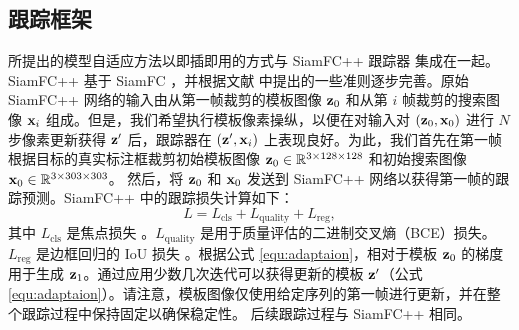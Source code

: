 \subsection{跟踪框架}
所提出的模型自适应方法以即插即用的方式与 SiamFC++ 跟踪器 \cite{SiamFC++} 集成在一起。 SiamFC++ 基于 SiamFC \cite{SiamFC}，并根据文献 \cite{SiamFC++} 中提出的一些准则逐步完善。原始 SiamFC++ 网络的输入由从第一帧裁剪的模板图像 $\textbf z_0$ 和从第 $i$ 帧裁剪的搜索图像 $\textbf x_i$ 组成。但是，我们希望执行模板像素操纵，以便在对输入对 $(\textbf z_0, \textbf x_0)$ 进行 $N$ 步像素更新获得 $\textbf z'$ 后，跟踪器在 $(\textbf z', \textbf x_i)$ 上表现良好。为此，我们首先在第一帧根据目标的真实标注框裁剪初始模板图像 $\textbf z_0\in\mathbb R^{3\times128\times 128}$ 和初始搜索图像 $\textbf x_0\in\mathbb R^{3\times303\times 303}$。
然后，将 $\textbf z_0$ 和 $\textbf x_0$ 发送到 SiamFC++ 网络以获得第一帧的跟踪预测。SiamFC++ \cite{SiamFC++} 中的跟踪损失计算如下：
\begin{equation}
    L = L_{\text{cls}} + L_{\text{quality}} + L_{\text{reg}},
\end{equation}
其中 $L_{\text{cls}}$ 是焦点损失 \cite{focal}。$L_{\text{quality}}$ 是用于质量评估的二进制交叉熵（BCE）损失。$L_{\text{reg}}$ 是边框回归的 IoU 损失 \cite{yu2016unitbox}。根据公式 \ref{equ:adaptaion}，相对于模板 $\textbf z_0$ 的梯度用于生成 $\textbf z_1$。通过应用少数几次迭代可以获得更新的模板 $\textbf z'$（公式 \ref{equ:adaptaion}）。请注意，模板图像仅使用给定序列的第一帧进行更新，并在整个跟踪过程中保持固定以确保稳定性。
后续跟踪过程与 SiamFC++ 相同。

